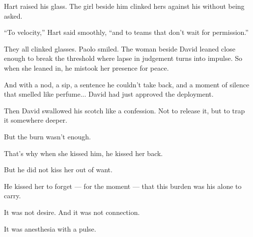 Hart raised his glass. The girl beside him clinked hers against his without being asked.

“To velocity,” Hart said smoothly, “and to teams that don’t wait for permission.”

They all clinked glasses.  
Paolo smiled.  
The woman beside David leaned close enough to break the threshold where lapse in judgement 
turns into impulse. So when she leaned in, he mistook her presence for peace.

And with a nod, a sip, a sentence he couldn’t take back,  
and a moment of silence that smelled like perfume...
David had just approved the deployment.

Then David swallowed his scotch like a confession.
Not to release it, but to trap it somewhere deeper.

But the burn wasn’t enough.

That's why when she kissed him, he kissed her back.

But he did not kiss her out of want.

He kissed her to forget --- for the moment --- that this burden was his alone to carry.

It was not desire. And it was not connection. 

It was anesthesia with a pulse.

\medskip

